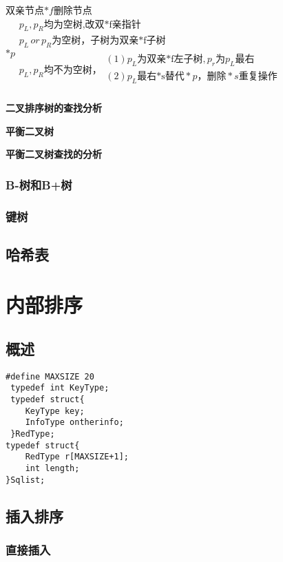 \documentclass[UTF8]{ctexart}
\newcommand{\mt}[1]{\text{#1}}
\newcommand{\mb}[1]{\textbf{#1}}
\newcommand{\p}{\par}
\newcommand{\ma}[1]{\begin{array}{llll} #1 \end{array}}
\begin{document}
双亲节点$*f$删除节点$*p\ma{
    p_L,p_R\mt{均为空树,改双*f亲指针}\\
    p_L \, or \, p_R\mt{为空树，子树为双亲*f子树}\\
    p_L,p_R\mt{均不为空树，}\ma{
        (1)p_L\mt{为双亲*f左子树},p_r\mt{为}p_L\mt{最右}\\
        (2)p_L\mt{最右*s替代}*p，\mt{删除}*s\mt{重复操作}\\
    }
}$


\mb{二叉排序树的查找分析}\p
\mb{平衡二叉树}\p
\mb{平衡二叉树查找的分析}\p




\subsubsection{B-树和B+树}
\subsubsection{键树}






\subsection{哈希表}





\newpage
\section{内部排序}


\subsection{概述}

\begin{lstlisting}[style=v1]
 #define MAXSIZE 20
 typedef int KeyType;
 typedef struct{
    KeyType key;
    InfoType ontherinfo;
 }RedType;
typedef struct{
    RedType r[MAXSIZE+1];
    int length;
}Sqlist;
\end{lstlisting}


\subsection{插入排序}
\subsubsection{直接插入}
\end{document}
